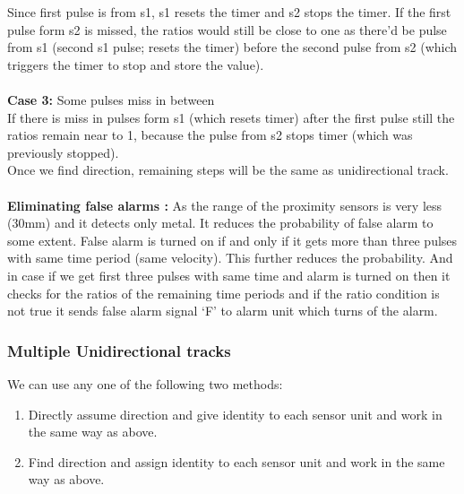 \documentclass[aps,letterpaper,11pt]{article}
\begin{document}
Since first pulse is from s1, s1 resets the timer and s2 stops the timer. If the first pulse form s2 is
missed, the ratios would still be close to one as there'd be pulse from s1 (second s1 pulse; resets
the timer) before the second pulse from s2 (which triggers the timer to stop and store the value). \\ \\

\textbf{Case 3:} Some pulses miss in between \\
If there is miss in pulses form s1 (which resets timer) after the first pulse still the ratios remain
near to 1, because the pulse from s2 stops timer (which was previously stopped). \\

Once we find direction, remaining steps will be the same as unidirectional track. \\ \\
\textbf{Eliminating false alarms :}
As the range of the proximity sensors is very less (30mm) and it detects only metal. It reduces the probability of false alarm to some extent. False alarm is turned on if and only if it gets more than three pulses with same time period (same velocity). This further reduces the probability. And in case
if we get first three pulses with same time and alarm is turned on then it checks for the ratios of the remaining time periods and if the ratio condition is not true it sends false alarm signal `F' to alarm unit which turns of the alarm. \\

\subsubsection{Multiple Unidirectional tracks}
We can use any one of the following two methods:
\begin{enumerate}
\item Directly assume direction and give identity to each sensor unit and work in the same way as above.
\item Find direction and assign identity to each sensor unit and work in the same way as above.
\end{enumerate}
\end{document}
